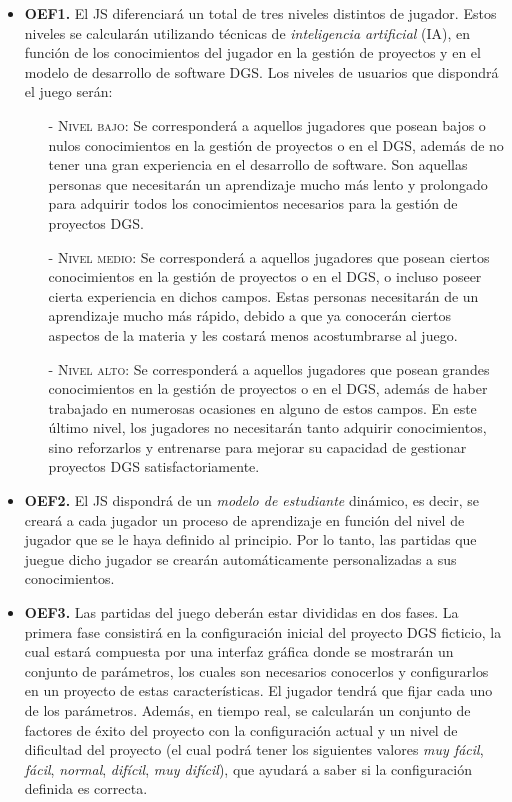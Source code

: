 \begin{itemize}
	\item \textbf{OEF1.} El JS diferenciará un total de tres niveles distintos de jugador. Estos niveles se calcularán utilizando técnicas de \emph{inteligencia artificial} (IA), en función de los conocimientos del jugador en la gestión de proyectos y en el modelo de desarrollo de software DGS. Los niveles de usuarios que dispondrá el juego serán:
	\begin{itemize}
		\item[-] \textsc{Nivel bajo:} Se corresponderá a aquellos jugadores que posean bajos o nulos conocimientos en la gestión de proyectos o en el DGS, además de no tener una gran experiencia en el desarrollo de software. Son aquellas personas que necesitarán un aprendizaje mucho más lento y prolongado para adquirir todos los conocimientos necesarios para la gestión de proyectos DGS.
		\item[-] \textsc{Nivel medio:} Se corresponderá a aquellos jugadores que posean ciertos conocimientos en la gestión de proyectos o en el DGS, o incluso poseer cierta experiencia en dichos campos. Estas personas necesitarán de un aprendizaje mucho más rápido, debido a que ya conocerán ciertos aspectos de la materia y les costará menos acostumbrarse al juego.
		\item[-] \textsc{Nivel alto:} Se corresponderá a aquellos jugadores que posean grandes conocimientos en la gestión de proyectos o en el DGS, además de haber trabajado en numerosas ocasiones en alguno de estos campos. En este último nivel, los jugadores no necesitarán tanto adquirir conocimientos, sino reforzarlos y entrenarse para mejorar su capacidad de gestionar proyectos DGS satisfactoriamente.
	\end{itemize}
	
	\item \textbf{OEF2.} El JS dispondrá de un \emph{modelo de estudiante} dinámico, es decir, se creará a cada jugador un proceso de aprendizaje en función del nivel de jugador que se le haya definido al principio. Por lo tanto, las partidas que juegue dicho jugador se crearán automáticamente personalizadas a sus conocimientos.
	
	\item \textbf{OEF3.} Las partidas del juego deberán estar divididas en dos fases. La primera fase consistirá en la configuración inicial del proyecto DGS ficticio, la cual estará compuesta por una interfaz gráfica donde se mostrarán un conjunto de parámetros, los cuales son necesarios conocerlos y configurarlos en un proyecto de estas características. El jugador tendrá que fijar cada uno de los parámetros. Además, en tiempo real, se calcularán un conjunto de factores de éxito del proyecto con la configuración actual y un nivel de dificultad del proyecto (el cual podrá tener los siguientes valores \emph{muy fácil}, \emph{fácil}, \emph{normal}, \emph{difícil}, \emph{muy difícil}), que ayudará a saber si la configuración definida es correcta.
	

\end{itemize}

